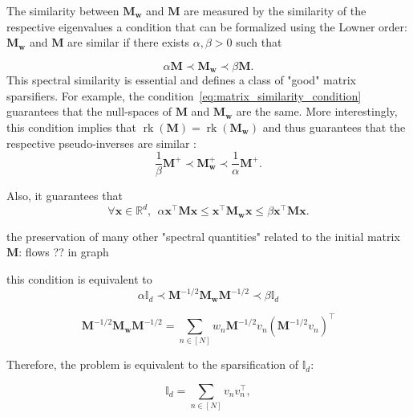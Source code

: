 \documentclass[twoside,11pt]{book}
\numberwithin{theorem}{chapter}
\numberwithin{definition}{chapter}
\numberwithin{proposition}{chapter}
\numberwithin{corollary}{chapter}
\numberwithin{example}{chapter}
\numberwithin{lemma}{chapter}
\DeclareMathOperator{\rank}{\mathrm{rk}}
\DeclareMathOperator{\Tran}{\intercal}
\begin{document}
The similarity between $\bm{M}_{\bm{w}}$ and $\bm{M}$ are measured by the similarity of the respective eigenvalues a condition that can be formalized using the Lowner order: $\bm{M}_{\bm{w}}$ and $\bm{M}$  are similar if there exists $\alpha,\beta>0$ such that

\begin{equation}\label{eq:matrix_similarity_condition}
\alpha \bm{M} \prec \bm{M}_{\bm{w}} \prec \beta \bm{M}.
\end{equation}
This spectral similarity is essential and defines a class of "good" matrix sparsifiers. For example, the condition~\eqref{eq:matrix_similarity_condition} guarantees that the null-spaces of $\bm{M}$ and $\bm{M}_{\bm{w}}$ are the same. More interestingly, this condition implies that $\rank(\bm{M}) = \rank(\bm{M}_{\bm{w}})$ and thus guarantees that the respective pseudo-inverses are similar \citep{MiAk77}:
\begin{equation}
\frac{1}{\beta} \bm{M}^{+} \prec \bm{M}_{\bm{w}}^{+} \prec \frac{1}{\alpha} \bm{M}^{+}.
\end{equation}

Also, it guarantees that 
\begin{equation}
\forall \bm{x} \in \mathbb{R}^{d}, \:\:
\alpha \bm{x}^{\Tran}\bm{M}\bm{x} \leq \bm{x}^{\Tran}\bm{M}_{\bm{w}}\bm{x} \leq \beta \bm{x}^{\Tran}\bm{M}\bm{x}.
\end{equation}

the preservation of many other "spectral quantities" related to the initial matrix $\bm{M}$: flows ?? in graph 





this condition is equivalent to
\begin{equation}
\alpha \mathbb{I}_{d} \prec \bm{M}^{-1/2}\bm{M}_{\bm{w}} \bm{M}^{-1/2} \prec \beta \mathbb{I}_{d}
\end{equation}

\begin{equation}
 \bm{M}^{-1/2}\bm{M}_{\bm{w}} \bm{M}^{-1/2}  = \sum\limits_{n \in [N]} w_{n} \bm{M}^{-1/2} v_{n} (\bm{M}^{-1/2} v_{n})^{\Tran}
\end{equation}


Therefore, the problem is equivalent to the sparsification of $\mathbb{I}_{d}$:

\begin{equation}\label{eq:sum_to_identity}
\mathbb{I}_{d} = \sum\limits_{n \in [N]}v_{n}v_{n}^{\Tran},
\end{equation}
\end{document}
